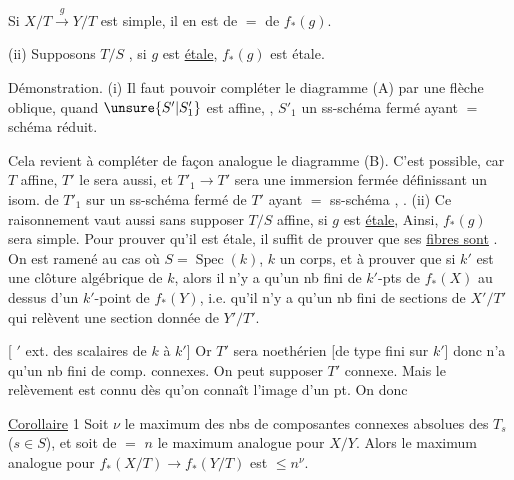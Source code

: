 Si $X/T\xrightarrow{g}Y/T$ est simple, il en est de $=$ de $f_*(g)$.


(ii) Supposons $T/S$  , si $g$ est \uline{étale}, $f_*(g)$ est étale.

Démonstration. (i) Il faut pouvoir compléter le diagramme (A) par une flèche oblique,  quand $\unsure{S'|S'_1}$ est affine, , $S'_1$ un ss-schéma fermé ayant $=$ schéma réduit.

Cela revient à compléter de façon analogue le diagramme (B). C'est possible, car $T$  affine, $T'$ le sera aussi, et $T'_1\to T'$ sera une immersion fermée définissant un isom. de $T'_1$ sur un ss-schéma fermé de $T'$ ayant $=$ ss-schéma ,  .
(ii) Ce raisonnement vaut aussi sans supposer $T/S$ affine, si $g$ est \uline{étale},  Ainsi, $f_*(g)$ sera simple. Pour prouver qu'il est étale, il suffit de prouver que ses \uline{fibres sont}   .  On est ramené au cas où $S=\operatorname{Spec}(k)$, $k$ un corps, et à prouver que si $k'$ est une clôture algébrique de $k$, alors il n'y a qu'un nb fini de $k'$-pts de $f_*(X)$ au dessus d'un $k'$-point de $f_*(Y)$, i.e. qu'il n'y a qu'un nb fini de sections de $X'/T'$ qui relèvent une section donnée de $Y'/T'$.

[ $'$  ext. des scalaires de $k$ à $k'$]
Or $T'$ sera noethérien [de type fini sur $k'$] donc n'a qu'un nb fini de comp. connexes. On peut supposer $T'$ connexe. Mais le relèvement est connu dès qu'on connaît l'image d'un pt. On  donc

\uline{Corollaire} 1 Soit $\nu$ le maximum des nbs  de composantes connexes absolues des $T_s$ ($s\in S$), et soit de $=$ $n$ le maximum analogue pour $X/Y$. Alors le maximum
analogue pour $f_*(X/T)\to f_*(Y/T)$ est $\leq n^\nu$.

